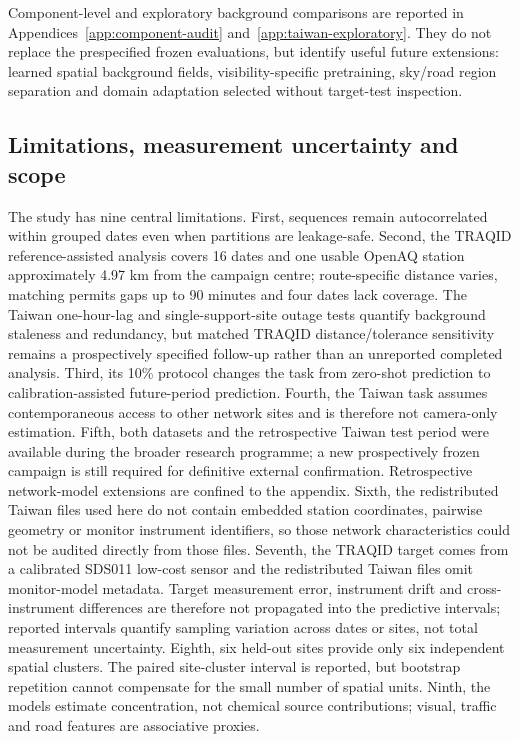 \documentclass[review,12pt,authoryear]{elsarticle}
\begin{document}
Component-level and exploratory background comparisons are reported in
Appendices~\ref{app:component-audit} and~\ref{app:taiwan-exploratory}. They do
not replace the prespecified frozen evaluations, but identify useful future
extensions: learned spatial background fields, visibility-specific pretraining,
sky/road region separation and domain adaptation selected without target-test
inspection.

\subsection{Limitations, measurement uncertainty and scope}

The study has nine central limitations. First, sequences remain autocorrelated
within grouped dates even when partitions are leakage-safe. Second, the TRAQID
reference-assisted analysis covers 16 dates and one usable OpenAQ station
approximately 4.97 km from the campaign centre; route-specific distance varies,
matching permits gaps up to 90 minutes and four dates lack coverage. The Taiwan
one-hour-lag and single-support-site outage tests quantify background staleness
and redundancy, but matched TRAQID distance/tolerance sensitivity remains a
prospectively specified follow-up rather than an unreported completed analysis.
Third, its 10\% protocol changes
the task from zero-shot prediction to calibration-assisted future-period
prediction. Fourth,
the Taiwan task assumes contemporaneous access to other network sites and is
therefore not camera-only estimation. Fifth, both datasets and the retrospective
Taiwan test period were available during the broader research programme; a new
prospectively frozen campaign is still required for definitive external
confirmation. Retrospective network-model extensions are confined to the
appendix. Sixth, the redistributed Taiwan files used here do not contain
embedded station coordinates, pairwise geometry or monitor instrument
identifiers, so those network characteristics could not be audited directly
from those files. Seventh, the TRAQID target comes from a calibrated SDS011
low-cost sensor and the redistributed Taiwan files omit monitor-model metadata.
Target measurement error, instrument drift and cross-instrument differences are
therefore not propagated into the predictive intervals; reported intervals
quantify sampling variation across dates or sites, not total measurement
uncertainty. Eighth, six held-out sites provide only six independent spatial
clusters. The paired site-cluster interval is reported, but bootstrap repetition
cannot compensate for the small number of spatial units. Ninth, the models
estimate concentration, not chemical source contributions; visual, traffic and
road features are associative proxies.
\end{document}
